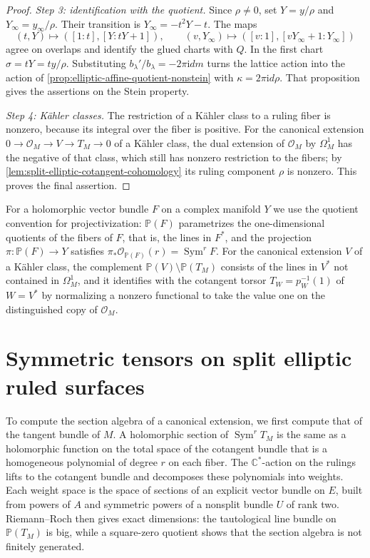\begin{proof}
\emph{Step 3: identification with the quotient.} Since $\rho\ne0$, set $Y=y/\rho$ and $Y_\infty=y_\infty/\rho$. Their transition is $Y_\infty=-t^2Y-t$. The maps
\[
 (t,Y)\longmapsto([1:t],[Y:tY+1]),\qquad
 (v,Y_\infty)\longmapsto([v:1],[vY_\infty+1:Y_\infty])
\]
agree on overlaps and identify the glued charts with $Q$. In the first chart $\sigma=tY=ty/\rho$. Substituting $b_\lambda'/b_\lambda=-2\pi\mathrm{i}dm$ turns the lattice action into the action of \cref{prop:elliptic-affine-quotient-nonstein} with $\kappa=2\pi\mathrm{i}d\rho$. That proposition gives the assertions on the Stein property.

\emph{Step 4: K\"ahler classes.} The restriction of a K\"ahler class to a ruling fiber is nonzero, because its integral over the fiber is positive. For the canonical extension $0\to\mathcal O_M\to V\to T_M\to0$ of a K\"ahler class, the dual extension of $\mathcal O_M$ by $\Omega^1_M$ has the negative of that class, which still has nonzero restriction to the fibers; by \cref{lem:split-elliptic-cotangent-cohomology} its ruling component $\rho$ is nonzero. This proves the final assertion.
\end{proof}

For a holomorphic vector bundle $F$ on a complex manifold $Y$ we use the quotient convention for projectivization: $\mathbb P(F)$ parametrizes the one-dimensional quotients of the fibers of $F$, that is, the lines in $F^*$, and the projection $\pi\colon\mathbb P(F)\to Y$ satisfies $\pi_*\mathcal O_{\mathbb P(F)}(r)=\operatorname{Sym}^rF$. For the canonical extension $V$ of a K\"ahler class, the complement $\mathbb P(V)\setminus\mathbb P(T_M)$ consists of the lines in $V^*$ not contained in $\Omega^1_M$, and it identifies with the cotangent torsor $T_W=p_W^{-1}(1)$ of $W=V^*$ by normalizing a nonzero functional to take the value one on the distinguished copy of $\mathcal O_M$.

\section{Symmetric tensors on split elliptic ruled surfaces}
\label{subsec:split-elliptic-symmetric-tensors}

To compute the section algebra of a canonical extension, we first compute that of the tangent bundle of $M$. A holomorphic section of $\operatorname{Sym}^rT_M$ is the same as a holomorphic function on the total space of the cotangent bundle that is a homogeneous polynomial of degree $r$ on each fiber. The $\mathbb C^*$-action on the rulings lifts to the cotangent bundle and decomposes these polynomials into weights. Each weight space is the space of sections of an explicit vector bundle on $E$, built from powers of $A$ and symmetric powers of a nonsplit bundle $U$ of rank two. Riemann--Roch then gives exact dimensions: the tautological line bundle on $\mathbb P(T_M)$ is big, while a square-zero quotient shows that the section algebra is not finitely generated.

